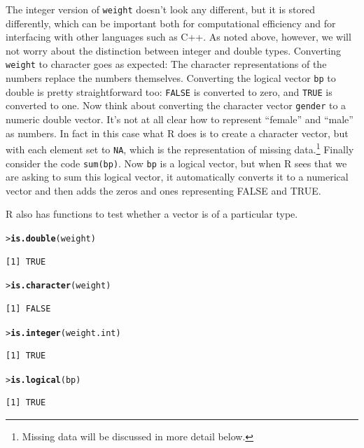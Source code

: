 \documentclass[12pt,oneside]{book}\usepackage[]{graphicx}\usepackage[]{color}
\makeatletter
\newcommand{\hlstd}[1]{\textcolor[rgb]{0.345,0.345,0.345}{#1}}%
\newcommand{\hlkwd}[1]{\textcolor[rgb]{0.737,0.353,0.396}{\textbf{#1}}}%
\newenvironment{kframe}{%
 \def\at@end@of@kframe{}%
 \ifinner\ifhmode%
  \def\at@end@of@kframe{\end{minipage}}%
  \begin{minipage}{\columnwidth}%
 \fi\fi%
 \def\FrameCommand##1{\hskip\@totalleftmargin \hskip-\fboxsep
 \colorbox{shadecolor}{##1}\hskip-\fboxsep
     \hskip-\linewidth \hskip-\@totalleftmargin \hskip\columnwidth}%
 \MakeFramed {\advance\hsize-\width
   \@totalleftmargin\z@ \linewidth\hsize
   \@setminipage}}%
 {\par\unskip\endMakeFramed%
 \at@end@of@kframe}
\newenvironment{knitrout}{}{} %
\makeatother
\begin{document}
The integer version of \verb+weight+ doesn't look any different, but it is stored differently, which can be important both for computational efficiency and for interfacing with other languages such as C++. As noted above, however, we will not worry about the distinction between integer and double types. Converting \verb+weight+ to character goes as expected: The character representations of the numbers replace the numbers themselves. Converting the logical vector \verb+bp+ to double is pretty straightforward too: \verb+FALSE+ is converted to zero, and \verb+TRUE+ is converted to one. Now think about converting the character vector \verb+gender+ to a numeric double vector. It's not at all clear how to represent ``female'' and ``male'' as numbers. In fact in this case what R does is to create a character vector, but with each element set to \verb+NA+, which is the representation of missing data.\footnote{Missing data will be discussed in more detail below.} Finally consider the code \verb+sum(bp)+. Now \verb+bp+ is a logical vector, but when R sees that we are asking to sum this logical vector, it automatically converts it to a numerical vector and then adds the zeros and ones representing FALSE and TRUE.

R also has functions to test whether a vector is of a particular type. 
\begin{knitrout}
\color{fgcolor}\begin{kframe}
\begin{alltt}
\hlstd{> }\hlkwd{is.double}\hlstd{(weight)}
\end{alltt}
\begin{verbatim}
[1] TRUE
\end{verbatim}
\begin{alltt}
\hlstd{> }\hlkwd{is.character}\hlstd{(weight)}
\end{alltt}
\begin{verbatim}
[1] FALSE
\end{verbatim}
\begin{alltt}
\hlstd{> }\hlkwd{is.integer}\hlstd{(weight.int)}
\end{alltt}
\begin{verbatim}
[1] TRUE
\end{verbatim}
\begin{alltt}
\hlstd{> }\hlkwd{is.logical}\hlstd{(bp)}
\end{alltt}
\begin{verbatim}
[1] TRUE
\end{verbatim}
\end{kframe}
\end{knitrout}
\end{document}
